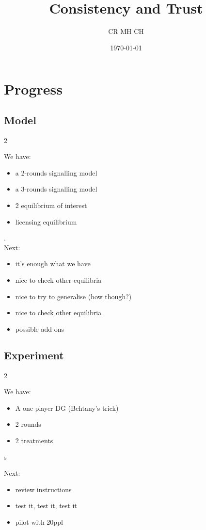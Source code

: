 \documentclass[11pt]{article}
\title{Consistency and Trust}
\date{\today}
\author{CR MH CH}
\theoremstyle{plainCl1}
\begin{document}
\maketitle
\onehalfspacing

\section{Progress}

\subsection{Model}

\begin{multicols} {2}

We have:
\begin{itemize}
    \item a 2-rounds signalling model
    \item a 3-rounds signalling model
    \item 2 equilibrium of interest
    \item licensing equilibrium
\end{itemize}
.\\

Next:
\begin{itemize}
    \item it's enough what we have
    \item nice to check other equilibria
    \item nice to try to generalise (how though?)
    \item nice to check other equilibria
    \item possible add-ons
\end{itemize}

\end{multicols}


\subsection{Experiment}

\begin{multicols} {2}

We have:
\begin{itemize}
    \item A one-player DG (Behtany's trick) 
    \item 2 rounds
    \item 2 treatments
\end{itemize}s

Next:
\begin{itemize}
    \item review instructions
    \item test it, test it, test it
    \item pilot with 20ppl
\end{itemize}

\end{multicols}
\end{document}
